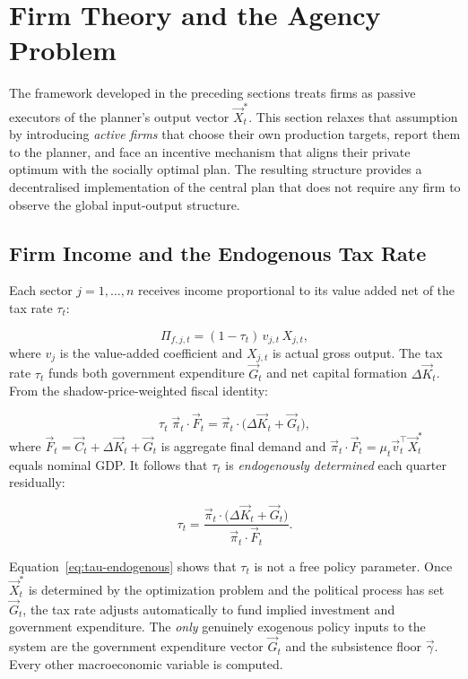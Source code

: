 \section{Firm Theory and the Agency Problem}\label{sec:firms}

The framework developed in the preceding sections treats firms as passive executors of
the planner's output vector $\vec{X}_t^*$. This section relaxes that assumption by
introducing \textit{active firms} that choose their own production targets, report them
to the planner, and face an incentive mechanism that aligns their private optimum with
the socially optimal plan. The resulting structure provides a decentralised
implementation of the central plan that does not require any firm to observe the global
input-output structure.

\subsection{Firm Income and the Endogenous Tax Rate}\label{sec:firm-income}

Each sector $j = 1, \ldots, n$ receives income proportional to its value added net of
the tax rate $\tau_t$:

\begin{equation}\label{eq:firm-income}
    \Pi_{f,j,t} = (1 - \tau_t)\, v_{j,t}\, X_{j,t},
\end{equation}
where $v_j$ is the value-added coefficient and $X_{j,t}$ is actual gross output. The tax
rate $\tau_t$ funds both government expenditure $\vec{G}_t$ and net capital formation
$\Delta\vec{K}_t$. From the shadow-price-weighted fiscal identity:

\begin{equation}\label{eq:fiscal-identity}
    \tau_t\;\vec{\pi}_t \cdot \vec{F}_t
        = \vec{\pi}_t \cdot \bigl(\Delta\vec{K}_t + \vec{G}_t\bigr),
\end{equation}
where $\vec{F}_t = \vec{C}_t + \Delta\vec{K}_t + \vec{G}_t$ is aggregate final demand
and $\vec{\pi}_t \cdot \vec{F}_t = \mu_{t }\vec{v}_{t}^\top \vec{X}_t^*$ equals nominal GDP. It
follows that $\tau_t$ is \textit{endogenously determined} each quarter residually:

\begin{equation}\label{eq:tau-endogenous}
    \boxed{\tau_t = \frac{\vec{\pi}_t \cdot \bigl(\Delta\vec{K}_t + \vec{G}_t\bigr)}
                  {\vec{\pi}_t \cdot \vec{F}_t}.}
\end{equation}

\begin{remark}\label{rem:policy}
Equation~\eqref{eq:tau-endogenous} shows that $\tau_t$ is not a free policy
parameter. Once $\vec{X}_t^*$ is determined by the optimization problem and the
political process has set $\vec{G}_t$, the tax rate adjusts automatically to fund
implied investment and government expenditure. The \textit{only} genuinely exogenous
policy inputs to the system are the government expenditure vector $\vec{G}_t$ and the
subsistence floor $\vec{\gamma}$. Every other macroeconomic variable is computed.
\end{remark}

